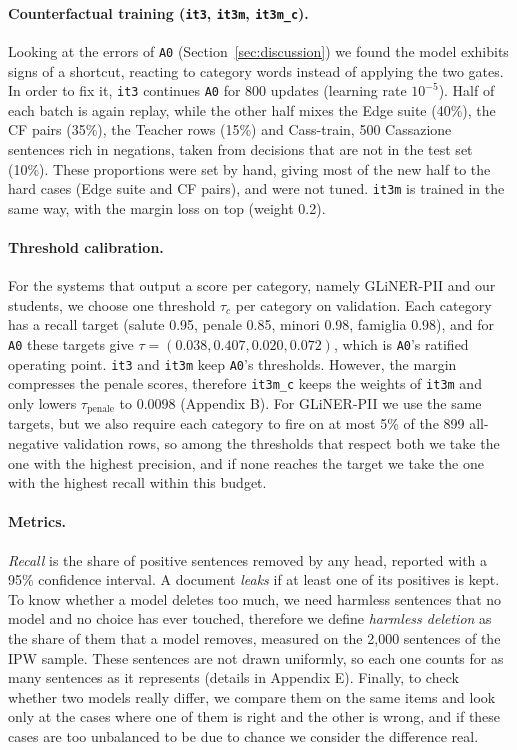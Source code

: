 \documentclass[11pt]{article}
\begin{document}
\paragraph{Counterfactual training (\texttt{it3}, \texttt{it3m}, \texttt{it3m\_c}).} Looking at the errors of \texttt{A0} (Section~\ref{sec:discussion}) we found the model exhibits signs of a shortcut, reacting to category words instead of applying the two gates. In order to fix it, \texttt{it3} continues \texttt{A0} for 800 updates (learning rate $10^{-5}$). Half of each batch is again replay, while the other half mixes the Edge suite (40\%), the CF pairs (35\%), the Teacher rows (15\%) and Cass-train, 500 Cassazione sentences rich in negations, taken from decisions that are not in the test set (10\%). These proportions were set by hand, giving most of the new half to the hard cases (Edge suite and CF pairs), and were not tuned. \texttt{it3m} is trained in the same way, with the margin loss on top (weight 0.2).

\paragraph{Threshold calibration.} For the systems that output a score per category, namely GLiNER-PII and our students, we choose one threshold $\tau_c$ per category on validation. Each category has a recall target (salute 0.95, penale 0.85, minori 0.98, famiglia 0.98), and for \texttt{A0} these targets give $\tau=(0.038, 0.407, 0.020, 0.072)$, which is \texttt{A0}'s ratified operating point. \texttt{it3} and \texttt{it3m} keep \texttt{A0}'s thresholds. However, the margin compresses the penale scores, therefore \texttt{it3m\_c} keeps the weights of \texttt{it3m} and only lowers $\tau_{\text{penale}}$ to 0.0098 (Appendix B). For GLiNER-PII we use the same targets, but we also require each category to fire on at most 5\% of the 899 all-negative validation rows, so among the thresholds that respect both we take the one with the highest precision, and if none reaches the target we take the one with the highest recall within this budget.

\paragraph{Metrics.} \emph{Recall} is the share of positive sentences removed by any head, reported with a 95\% confidence interval. A document \emph{leaks} if at least one of its positives is kept. To know whether a model deletes too much, we need harmless sentences that no model and no choice has ever touched, therefore we define \emph{harmless deletion} as the share of them that a model removes, measured on the 2,000 sentences of the IPW sample. These sentences are not drawn uniformly, so each one counts for as many sentences as it represents (details in Appendix E). Finally, to check whether two models really differ, we compare them on the same items and look only at the cases where one of them is right and the other is wrong, and if these cases are too unbalanced to be due to chance we consider the difference real.
\end{document}
